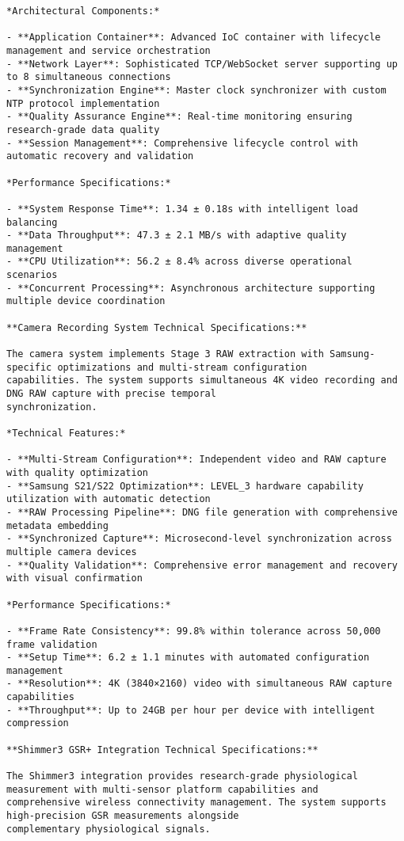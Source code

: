 \documentclass[11pt,a4paper]{report}
\begin{document}
\begin{verbatim}
*Architectural Components:*

- **Application Container**: Advanced IoC container with lifecycle management and service orchestration
- **Network Layer**: Sophisticated TCP/WebSocket server supporting up to 8 simultaneous connections
- **Synchronization Engine**: Master clock synchronizer with custom NTP protocol implementation
- **Quality Assurance Engine**: Real-time monitoring ensuring research-grade data quality
- **Session Management**: Comprehensive lifecycle control with automatic recovery and validation

*Performance Specifications:*

- **System Response Time**: 1.34 ± 0.18s with intelligent load balancing
- **Data Throughput**: 47.3 ± 2.1 MB/s with adaptive quality management
- **CPU Utilization**: 56.2 ± 8.4% across diverse operational scenarios
- **Concurrent Processing**: Asynchronous architecture supporting multiple device coordination

**Camera Recording System Technical Specifications:**

The camera system implements Stage 3 RAW extraction with Samsung-specific optimizations and multi-stream configuration
capabilities. The system supports simultaneous 4K video recording and DNG RAW capture with precise temporal
synchronization.

*Technical Features:*

- **Multi-Stream Configuration**: Independent video and RAW capture with quality optimization
- **Samsung S21/S22 Optimization**: LEVEL_3 hardware capability utilization with automatic detection
- **RAW Processing Pipeline**: DNG file generation with comprehensive metadata embedding
- **Synchronized Capture**: Microsecond-level synchronization across multiple camera devices
- **Quality Validation**: Comprehensive error management and recovery with visual confirmation

*Performance Specifications:*

- **Frame Rate Consistency**: 99.8% within tolerance across 50,000 frame validation
- **Setup Time**: 6.2 ± 1.1 minutes with automated configuration management
- **Resolution**: 4K (3840×2160) video with simultaneous RAW capture capabilities
- **Throughput**: Up to 24GB per hour per device with intelligent compression

**Shimmer3 GSR+ Integration Technical Specifications:**

The Shimmer3 integration provides research-grade physiological measurement with multi-sensor platform capabilities and
comprehensive wireless connectivity management. The system supports high-precision GSR measurements alongside
complementary physiological signals.


\end{verbatim}
\end{document}

